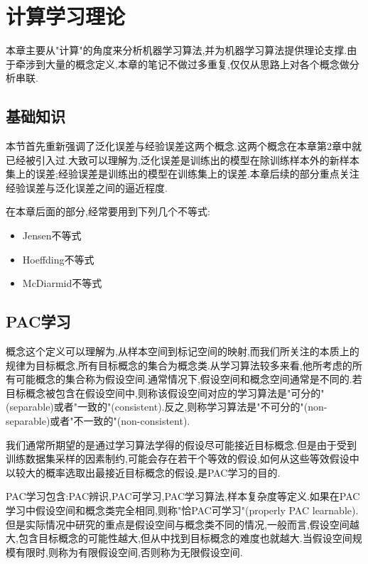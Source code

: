 \chapter{计算学习理论}

本章主要从"计算"的角度来分析机器学习算法,并为机器学习算法提供理论支撑.由于牵涉到大量的概念定义,本章的笔记不做过多重复,仅仅从思路上对各个概念做分析串联.

\section{基础知识}

本节首先重新强调了泛化误差与经验误差这两个概念.这两个概念在本章第2章中就已经被引入过.大致可以理解为,泛化误差是训练出的模型在除训练样本外的新样本集上的误差;经验误差是训练出的模型在训练集上的误差.本章后续的部分重点关注经验误差与泛化误差之间的逼近程度.

在本章后面的部分,经常要用到下列几个不等式:
\begin{itemize}
\item Jensen不等式
\item Hoeffding不等式
\item McDiarmid不等式
\end{itemize}

\section{PAC学习}

概念这个定义可以理解为,从样本空间到标记空间的映射,而我们所关注的本质上的规律为目标概念,所有目标概念的集合为概念类.从学习算法较多来看,他所考虑的所有可能概念的集合称为假设空间.通常情况下,假设空间和概念空间通常是不同的.若目标概念被包含在假设空间中,则称该假设空间对应的学习算法是"可分的"(separable)或者"一致的"(consistent).反之,则称学习算法是"不可分的"(non-separable)或者"不一致的"(non-consistent).

我们通常所期望的是通过学习算法学得的假设尽可能接近目标概念.但是由于受到训练数据集采样的因素制约,可能会存在若干个等效的假设,如何从这些等效假设中以较大的概率选取出最接近目标概念的假设,是PAC学习的目的.

PAC学习包含:PAC辨识,PAC可学习,PAC学习算法,样本复杂度等定义.如果在PAC学习中假设空间和概念类完全相同,则称"恰PAC可学习"(properly PAC learnable).但是实际情况中研究的重点是假设空间与概念类不同的情况,一般而言,假设空间越大,包含目标概念的可能性越大,但从中找到目标概念的难度也就越大.当假设空间规模有限时,则称为有限假设空间,否则称为无限假设空间.

